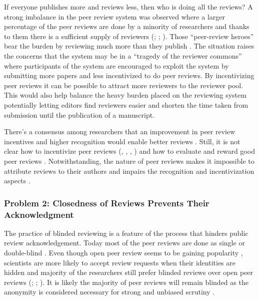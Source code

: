 If everyone publishes more and reviews less, then who is doing all the reviews? A strong imbalance in the peer review system was observed where a larger percentage of the peer reviews are done by a minority of researchers and thanks to them there is a sufficient supply of reviewers (\cite{Kovanis.2016}; \cite{Petchey.2014}; \cite[37]{Ware.2008}). Those “peer-review heroes” bear the burden by reviewing much more than they publish \parencite[9]{Kovanis.2016}. The situation raises the concerns that the system may be in a “tragedy of the reviewer commons” \parencite{Hochberg.2009} where participants of the system are encouraged to exploit the system by submitting more papers and less incentivized to do peer reviews. By incentivizing peer reviews it can be possible to attract more reviewers to the reviewer pool. This would also help balance the heavy burden placed on the reviewing system potentially letting editors find reviewers easier and shorten the time taken from submission until the publication of a manuscript. 

There’s a consensus among researchers that an improvement in peer review incentives and higher recognition would enable better reviews \parencite{Publons.2018}. Still, it is not clear how to incentivize peer reviews (\cite[28]{Ware.2008}, \cite{Warne.2016}, \cite{Gasparyan.2015}, \cite{Tite.2007}) and how to evaluate and reward good peer reviews \parencite[12]{Ferreira.2016}. Notwithstanding, the nature of peer reviews makes it impossible to attribute reviews to their authors and impairs the recognition and incentivization aspects \parencite[4]{Tennant.2018b}.

\subsubsection{Problem 2: Closedness of Reviews Prevents Their Acknowledgment}

The practice of blinded reviewing is a feature of the process that hinders public review acknowledgement. Today most of the peer reviews are done as single or double-blind \parencite{Wolfram.2020}. Even though open peer review seems to be gaining popularity \parencite{Wolfram.2020}, scientists are more likely to accept review requests when their identities are hidden \parencite{vanRooyen.1999} and majority of the researchers still prefer blinded reviews over open peer reviews (\cite[149]{Mulligan.2013}; \cite{Taylor&Francis.2015}; \cite[1038-1039]{Wolfram.2020}). It is likely the majority of peer reviews will remain blinded as the anonymity is considered necessary for strong and unbiased scrutiny \parencite[21-23]{RossHellauer.2017}.

